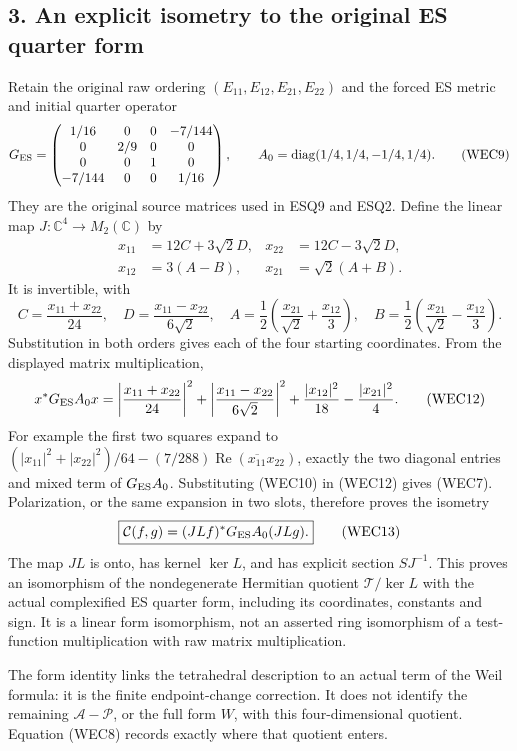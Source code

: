 \documentclass[
  10pt,
  a4paper,
]{article}
\begin{document}
\subsection{3. An explicit isometry to the original ES quarter
form}\label{an-explicit-isometry-to-the-original-es-quarter-form}

Retain the original raw ordering \((E_{11},E_{12},E_{21},E_{22})\) and
the forced ES metric and initial quarter operator \[
G_{\rm ES}=\begin{pmatrix}
1/16&0&0&-7/144\\0&2/9&0&0\\0&0&1&0\\-7/144&0&0&1/16
\end{pmatrix},\qquad
A_0=\operatorname{diag}(1/4,1/4,-1/4,1/4).
\tag{WEC9}
\] They are the original source matrices used in ESQ9 and ESQ2. Define
the linear map \(J:\mathbb C^4\to M_2(\mathbb C)\) by \[
\begin{aligned}
x_{11}&=12C+3\sqrt2D,&x_{22}&=12C-3\sqrt2D,\\
x_{12}&=3(A-B),&x_{21}&=\sqrt2(A+B).
\end{aligned}
\tag{WEC10}
\] It is invertible, with \[
C=\frac{x_{11}+x_{22}}{24},\quad D=\frac{x_{11}-x_{22}}{6\sqrt2},\quad
A=\frac12\left(\frac{x_{21}}{\sqrt2}+\frac{x_{12}}3\right),\quad
B=\frac12\left(\frac{x_{21}}{\sqrt2}-\frac{x_{12}}3\right).
\tag{WEC11}
\] Substitution in both orders gives each of the four starting
coordinates. From the displayed matrix multiplication, \[
x^*G_{\rm ES}A_0x=
\left|\frac{x_{11}+x_{22}}{24}\right|^2+
\left|\frac{x_{11}-x_{22}}{6\sqrt2}\right|^2+
\frac{|x_{12}|^2}{18}-\frac{|x_{21}|^2}{4}.
\tag{WEC12}
\] For example the first two squares expand to
\((|x_{11}|^2+|x_{22}|^2)/64-(7/288)\operatorname{Re}(\overline{x_{11}}x_{22})\),
exactly the two diagonal entries and mixed term of \(G_{\rm ES}A_0\).
Substituting (WEC10) in (WEC12) gives (WEC7). Polarization, or the same
expansion in two slots, therefore proves the isometry \[
\boxed{\mathcal C(f,g)=(JLf)^*G_{\rm ES}A_0(JLg).}
\tag{WEC13}
\] The map \(JL\) is onto, has kernel \(\ker L\), and has explicit
section \(SJ^{-1}\). This proves an isomorphism of the nondegenerate
Hermitian quotient \(\mathcal T/\ker L\) with the actual complexified ES
quarter form, including its coordinates, constants and sign. It is a
linear form isomorphism, not an asserted ring isomorphism of a
test-function multiplication with raw matrix multiplication.

The form identity links the tetrahedral description to an actual term of
the Weil formula: it is the finite endpoint-change correction. It does
not identify the remaining \(\mathcal A-\mathcal P\), or the full form
\(W\), with this four-dimensional quotient. Equation (WEC8) records
exactly where that quotient enters.
\end{document}
